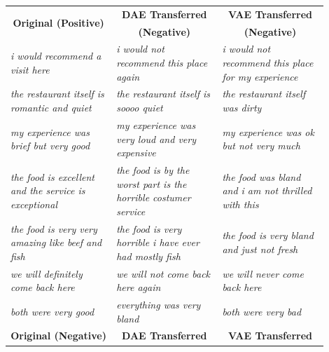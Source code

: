 \documentclass[11pt,a4paper]{article}
\newcommand{\tabh}[1]{\multicolumn{1}{c|}{\textbf{#1}}}
\newcommand{\tabc}[2]{\multicolumn{1}{|c|}{\multirow{#1}{*}{\textbf{#2}}}}
\begin{document}
\begin{table}[ht]
	\centering
	\begin{tabular}{| p{0.3\linewidth} | p{0.3\linewidth} | p{0.3\linewidth} |}
		\hline
		\tabc{2}{Original (Positive)}                                   & \tabh{DAE Transferred}                                                  & \tabh{VAE Transferred}                                               \\
		                                                                & \tabh{(Negative)}                                                       & \tabh{(Negative)}                                                    \\
		\hline
		\hline
		\textit{i would recommend a visit here}                         & \textit{i would not recommend this place again}                         & \textit{i would not recommend this place for my experience}          \\
		\hline
		\textit{the restaurant itself is romantic and quiet}            & \textit{the restaurant itself is soooo quiet}                           & \textit{the restaurant itself was dirty}                             \\
		\hline
		\textit{my experience was brief but very good}                  & \textit{my experience was very loud and very expensive}                 & \textit{my experience was ok but not very much}                      \\
		\hline
		\textit{the food is excellent and the service is exceptional}   & \textit{the food is by the worst part is the horrible costumer service} & \textit{the food was bland and i am not thrilled with this}          \\
		\hline
		\textit{the food is very very amazing like beef and fish}       & \textit{the food is very horrible i have ever had mostly fish}          & \textit{the food is very bland and just not fresh}                   \\
		\hline
		\textit{we will definitely come back here}                      & \textit{we will not come back here again}                               & \textit{we will never come back here}                                \\
		\hline
		\textit{both were very good}                                    & \textit{everything was very bland}                                      & \textit{both were very bad}                                          \\
		\hline
		\hline
		\hline
		\tabc{2}{Original (Negative)}                                   & \tabh{DAE Transferred}                                                  & \tabh{VAE Transferred}                                               \\

\end{tabular}
\end{table}
\end{document}
